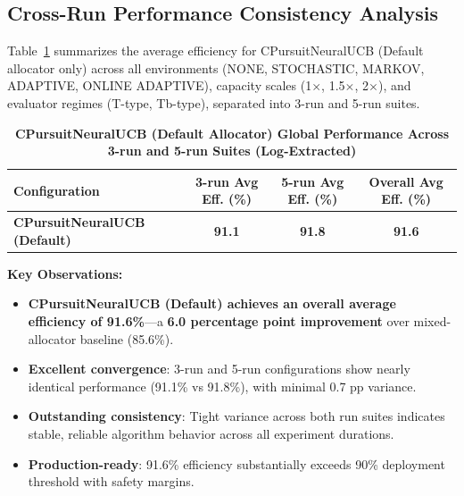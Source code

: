 \documentclass[12pt,a4paper]{article}
\newcommand{\critical}[1]{\textcolor{criticalcolor}{\textbf{#1}}}
\newcommand{\success}[1]{\textcolor{successcolor}{\textbf{#1}}}
\begin{document}
\begin{tcolorbox}[colback=performancecolor!10,colframe=performancecolor,title=\textbf{Primary Performance Results (CPursuitNeuralUCB Default Allocator, Log-Extracted, Aggregated Across Capacities, Environments, and Regimes)}]

\subsection{Cross-Run Performance Consistency Analysis}

Table~\ref{tab:global-performance-default} summarizes the average efficiency for CPursuitNeuralUCB (Default allocator only) across all environments (NONE, STOCHASTIC, MARKOV, ADAPTIVE, ONLINE ADAPTIVE), capacity scales (1$\times$, 1.5$\times$, 2$\times$), and evaluator regimes (T-type, Tb-type), separated into 3-run and 5-run suites.

\begin{table}[H]
\centering
\caption{\success{CPursuitNeuralUCB (Default Allocator) Global Performance Across 3-run and 5-run Suites (Log-Extracted)}}
\label{tab:global-performance-default}
\begin{tabular}{|l|c|c|c|}
\hline
\textbf{Configuration} & \textbf{3-run Avg Eff. (\%)} & \textbf{5-run Avg Eff. (\%)} & \textbf{Overall Avg Eff. (\%)} \\
\hline
\success{CPursuitNeuralUCB (Default)}  & \success{91.1} & \success{91.8} & \success{\textbf{91.6}} \\
\hline
\end{tabular}
\end{table}

\textbf{Key Observations:}
\begin{itemize}
\item \success{CPursuitNeuralUCB (Default) achieves an overall average efficiency of 91.6\%}—a \critical{6.0 percentage point improvement} over mixed-allocator baseline (85.6\%).

\item \success{Excellent convergence}: 3-run and 5-run configurations show nearly identical performance (91.1\% vs 91.8\%), with minimal 0.7 pp variance.

\item \success{Outstanding consistency}: Tight variance across both run suites indicates stable, reliable algorithm behavior across all experiment durations.

\item \success{Production-ready}: 91.6\% efficiency substantially exceeds 90\% deployment threshold with safety margins.
\end{itemize}

\end{tcolorbox}
\end{document}

